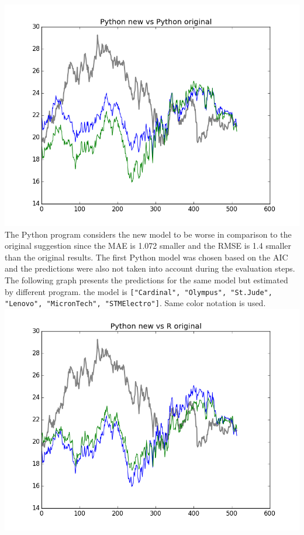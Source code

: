 \documentclass [twoside,
  11pt, a4paper,
  footinclude=true,
  headinclude=true,
  cleardoublepage=empty
]{article}
\begin{document}
\includegraphics[scale=0.75]{PythonOriginalVsPythonNew.png}\\
The Python program considers the new model to be worse in comparison to the original suggestion since the MAE is 1.072 smaller and the RMSE is 1.4 smaller than the original results. The first Python model was chosen based on the AIC and the predictions were also not taken into account during the evaluation steps.\\
The following graph presents the predictions for the same model but estimated by different program. the model is \texttt{["Cardinal", "Olympus", "St.Jude", "Lenovo", "MicronTech", "STMElectro"]}. Same color notation is used.\\
\includegraphics[scale=0.75]{ROriginalVsPythonNew.png}
\end{document}
